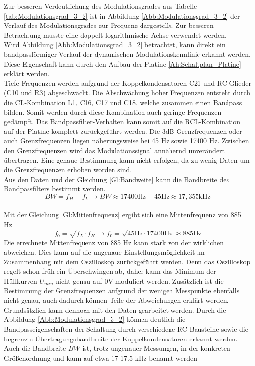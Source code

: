 \documentclass[12pt]{scrartcl}
\begin{document}
Zur besseren Verdeutlichung des Modulationsgrades aus Tabelle \ref{tab:Modulationsgrad_3_2} ist in Abbildung \ref{Abb:Modulationsgrad_3_2} der Verlauf des Modulationsgrades zur Frequenz dargestellt.
Zur besseren Betrachtung musste eine doppelt logarithmische Achse verwendet werden.\\
Wird Abbildung \ref{Abb:Modulationsgrad_3_2} betrachtet, kann direkt ein bandpassförmiger Verlauf der dynamischen Modulationskennlinie erkannt werden.
Diese Eigenschaft kann durch den Aufbau der Platine \ref{Ah:Schaltplan_Platine} erklärt werden.\\
Tiefe Frequenzen werden aufgrund der Koppelkondensatoren C21 und RC-Glieder (C10 und R3) abgeschwächt.
Die Abschwächung hoher Frequenzen entsteht durch die CL-Kombination L1, C16, C17 und C18, welche zusammen einen Bandpass bilden.
Somit werden durch diese Kombination auch geringe Frequenzen gedämpft.
Das Bandpassfilter-Verhalten kann somit auf die RCL-Kombination auf der Platine komplett zurückgeführt werden.
Die 3dB-Grenzfrequenzen oder auch Grenzfrequenzen liegen näherungsweise bei 45 Hz sowie 17400 Hz.
Zwischen den Grenzfrequenzen wird das Modulationssignal annähernd unverändert übertragen.
Eine genaue Bestimmung kann nicht erfolgen, da zu wenig Daten um die Grenzfrequenzen erhoben worden sind.\\
Aus den Daten und der Gleichung \ref{Gl:Bandweite} kann die Bandbreite des Bandpassfilters bestimmt werden.
\begin{equation*}
    BW = f_H-f_L \rightarrow BW \approx 17400\text{Hz}-45\text{Hz} \approx 17,355\text{kHz}
\end{equation*}\\
Mit der Gleichung \ref{Gl:Mittenfrequenz} ergibt sich eine Mittenfrequenz von 885 Hz
\begin{equation*}
    f_0=\sqrt{f_L\cdot f_H} \rightarrow f_0=\sqrt{45\text{Hz}\cdot 17400\text{Hz}} \approx 885 \text{Hz}
\end{equation*}
Die errechnete Mittenfrequenz von 885 Hz kann stark von der wirklichen abweichen.
Dies kann auf die ungenaue Einstellungsmöglichkeit im Zusammenhang mit dem Oszilloskop zurückgeführt werden.
Denn das Oszilloskop regelt schon früh ein Überschwingen ab, daher kann das Minimum der Hüllkurven $U_{min}$ nicht genau auf 0V moduliert werden.
Zusätzlich ist die Bestimmung der Grenzfrequenzen aufgrund der wenigen Messpunkte ebenfalls nicht genau, auch dadurch können Teile der Abweichungen erklärt werden.\\
Grundsätzlich kann dennoch mit den Daten gearbeitet werden.
Durch die Abbildung \ref{Abb:Modulationsgrad_3_2} können deutlich die Bandpasseigenschaften der Schaltung durch verschiedene RC-Bausteine sowie die begrenzte Übertragungsbandbreite der Koppelkondensatoren erkannt werden.
Auch die Bandbreite $BW$ ist, trotz ungenauer Messungen, in der konkreten Größenordnung und kann auf etwa 17-17.5 kHz benannt werden.
\newpage
\end{document}
